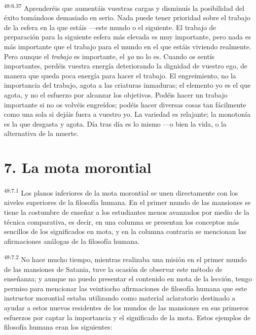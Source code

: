 \par
\textsuperscript{48:6.37} Aprenderéis que aumentáis vuestras cargas y disminuís la posibilidad del éxito tomándoos demasiado en serio. Nada puede tener prioridad sobre el trabajo de la esfera en la que estáis ---este mundo o el siguiente. El trabajo de preparación para la siguiente esfera más elevada es muy importante, pero nada es más importante que el trabajo para el mundo en el que estáis viviendo realmente. Pero aunque el \textit{trabajo} es importante, el \textit{yo} no lo es. Cuando os sentís importantes, perdéis vuestra energía deteriorando la dignidad de vuestro ego, de manera que queda poca energía para hacer el trabajo. El engreimiento, no la importancia del trabajo, agota a las criaturas inmaduras; el elemento yo es el que agota, y no el esfuerzo por alcanzar los objetivos. Podéis hacer un trabajo importante si no os volvéis engreídos; podéis hacer diversas cosas tan fácilmente como una sola si dejáis fuera a vuestro yo. La variedad es relajante; la monotonía es la que desgasta y agota. Día tras día es lo mismo ---o bien la vida, o la alternativa de la muerte.

\section*{7. La mota morontial}
\par
\textsuperscript{48:7.1} Los planos inferiores de la mota morontial se unen directamente con los niveles superiores de la filosofía humana. En el primer mundo de las mansiones se tiene la costumbre de enseñar a los estudiantes menos avanzados por medio de la técnica comparativa, es decir, en una columna se presentan los conceptos más sencillos de los significados en mota, y en la columna contraria se mencionan las afirmaciones análogas de la filosofía humana.

\par
\textsuperscript{48:7.2} No hace mucho tiempo, mientras realizaba una misión en el primer mundo de las mansiones de Satania, tuve la ocasión de observar este método de enseñanza; y aunque no puedo presentar el contenido en mota de la lección, tengo permiso para mencionar las veintiocho afirmaciones de filosofía humana que este instructor morontial estaba utilizando como material aclaratorio destinado a ayudar a estos nuevos residentes de los mundos de las mansiones en sus primeros esfuerzos por captar la importancia y el significado de la mota. Estos ejemplos de filosofía humana eran los siguientes:

